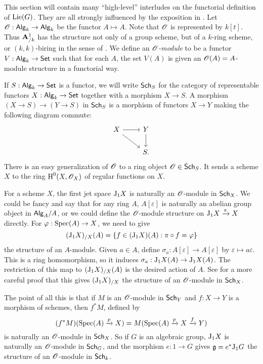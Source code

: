 \begin{hard}
This section will contain many ``high-level'' interludes on the functorial 
definition of $\operatorname{Lie}(G)$. They are all strongly influenced by the exposition in 
\cite[II \S3--4]{sga3-i}. Let $\mathscr{O}:\mathsf{Alg}_{k}\to \mathsf{Alg}_{k}$ be the functor 
$A\mapsto A$. Note that $\mathscr{O}$ is represented by $k[t]$. Thus $\mathbf{A}^1_{/k}$ has 
the structure not only of a group scheme, but of a $k$-ring scheme, or 
$(k,k)$-biring in the sense of \cite{borger-wieland-2005}. We define an 
\emph{$\mathscr{O}$-module} to be a functor $V:\mathsf{Alg}_{k}\to \mathsf{Set}$ such that for each 
$A$, the set $V(A)$ is given an $\mathscr{O}(A)=A$-module structure in a functorial 
way. 

If $S:\mathsf{Alg}_{k} \to \mathsf{Set}$ is a functor, we will write 
$\mathsf{Sch}_{S}$ for the category of representable functors 
$X:\mathsf{Alg}_{k}\to \mathsf{Set}$ together with a morphism $X\to S$. A morphism 
$(X\to S)\to (Y\to S)$ in $\mathsf{Sch}_{S}$ is a morphism of functors 
$X\to Y$ making the following diagram commute:
\[\begin{tikzcd}
  X \ar[r] \ar[dr] 
    & Y \ar[d] \\
  & S .
\end{tikzcd}\]
There is an easy generalization of $\mathscr{O}$ to a ring object 
$\mathscr{O}\in\mathsf{Sch}_{S}$. It sends a scheme $X$ to the ring $\operatorname{H}^0(X,\mathscr{O}_X)$ of 
regular functions on $X$. 

For a scheme $X$, the first jet space 
$\mathrm{J}_1 X$ is naturally an $\mathscr{O}$-module in $\mathsf{Sch}_{X}$. We could be fancy and 
say that for any ring $A$, $A[\varepsilon]$ is naturally an abelian group 
object in $\mathsf{Alg}_{A}/A$, or we could define the $\mathscr{O}$-module structure on 
$\mathrm{J}_1 X\xrightarrow\pi X$ directly. For $\varphi:\operatorname{Spec}(A)\to X$, we need 
to give 
\[
  (\mathrm{J}_1 X)_{/X}(A) = \{f\in (\mathrm{J}_1 X)(A):\pi\circ f = \varphi\} 
\]
the structure of an $A$-module. Given $a\in A$, define 
$\sigma_a:A[\varepsilon]\to A[\varepsilon]$ by 
$\varepsilon\mapsto a\varepsilon$. This is a ring homomorphism, so it induces 
$\sigma_a:\mathrm{J}_1 X(A)\to \mathrm{J}_1 X(A)$. The restriction of this map to 
$(\mathrm{J}_1 X)_{/X}(A)$ is the desired action of $A$. See \cite[II 3.4.1]{sga3-i} 
for a more careful proof that this gives $(\mathrm{J}_1 X)_{/X}$ the structure of 
an $\mathscr{O}$-module in $\mathsf{Sch}_{X}$. 

The point of all this is that if $M$ is an $\mathscr{O}$-module in 
$\mathsf{Sch}_{Y}$ and $f:X\to Y$ is a morphism of schemes, then 
$f^\ast M$, defined by 
\[
  (f^\ast M)(\operatorname{Spec}(A)\xrightarrow p X) = M(\operatorname{Spec}(A)\xrightarrow p X\xrightarrow f Y)
\]
is naturally an $\mathscr{O}$-module in $\mathsf{Sch}_{X}$. So if $G$ is an algebraic group, 
$\mathrm{J}_1 X$ is naturally an $\mathscr{O}$-module in $\mathsf{Sch}_{G}$, and the morphism 
$e:1\to G$ gives $\mathfrak{g}=e^\ast \mathrm{J}_1 G$ the structure of an $\mathscr{O}$-module in 
$\mathsf{Sch}_{k}$. 
\end{hard}


